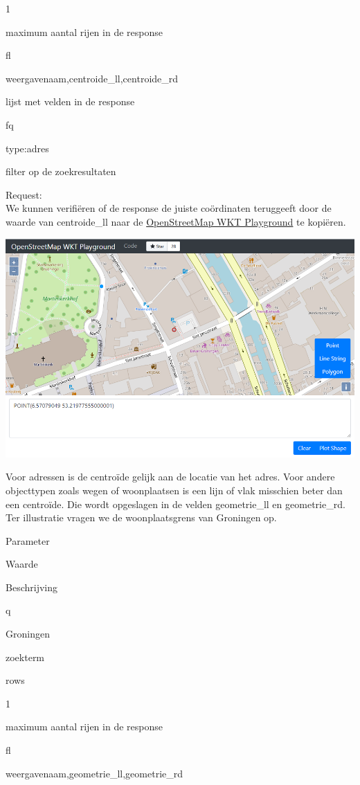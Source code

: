 \documentclass[]{book}
\begin{document}
{1}

maximum aantal rijen in de response

{fl}

{weergavenaam,centroide\_ll,centroide\_rd}

lijst met velden in de response

{fq}

{type:adres}

filter op de zoekresultaten

Request:\\

We kunnen verifiëren of de response de juiste coördinaten teruggeeft door de waarde van {centroide\_ll} naar de \href{https://clydedacruz.github.io/openstreetmap-wkt-playground/}{OpenStreetMap WKT Playground} te kopiëren.

\includegraphics[width=1\linewidth]{images/img01}

Voor adressen is de centroïde gelijk aan de locatie van het adres. Voor andere objecttypen zoals wegen of woonplaatsen is een lijn of vlak misschien beter dan een centroïde. Die wordt opgeslagen in de velden {geometrie\_ll} en {geometrie\_rd}. Ter illustratie vragen we de woonplaatsgrens van Groningen op.

Parameter

Waarde

Beschrijving

{q}

{Groningen}

zoekterm

{rows}

{1}

maximum aantal rijen in de response

{fl}

{weergavenaam,geometrie\_ll,geometrie\_rd}
\end{document}

